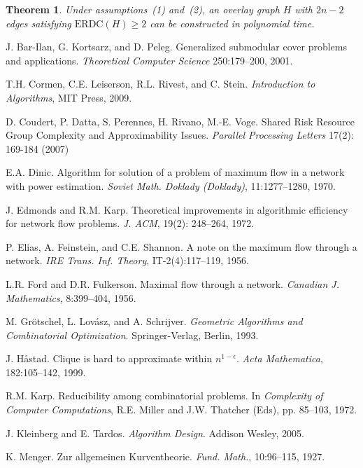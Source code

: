 \LongVersion \documentclass[11pt]{article}
\newtheorem{theorem}{Theorem}[section]
\theoremstyle{definition}
\theoremstyle{plain}
\newcommand{\ERDC}[0]{\mathrm{ERDC}}
\begin{document}
\begin{theorem} \label{theorem:ConstructionSparseERDC}
Under assumptions~(1) and~(2), an overlay graph $H$ with $2 n - 2$ edges
satisfying $\ERDC(H) \geq 2$ can be constructed in polynomial time.
\end{theorem}

\newpage
\begin{thebibliography}{99}

J. Bar-Ilan, G. Kortsarz, and D. Peleg.
Generalized submodular cover problems and applications.
\emph{Theoretical Computer Science} 250:179--200, 2001.

T.H. Cormen, C.E. Leiserson, R.L. Rivest, and C. Stein.
\emph{Introduction to Algorithms}, MIT Press, 2009.

D. Coudert, P. Datta, S. Perennes, H. Rivano, M.-E. Voge.
Shared Risk Resource Group Complexity and Approximability Issues.
{\em Parallel Processing Letters} 17(2): 169-184 (2007)

E.A. Dinic.
Algorithm for solution of a problem of maximum flow in a network with power
estimation.
\emph{Soviet Math. Doklady (Doklady)}, 11:1277--1280, 1970.

J. Edmonds and R.M. Karp.
Theoretical improvements in algorithmic efficiency for network flow problems.
\emph{J. ACM}, 19(2): 248--264, 1972.

P. Elias, A. Feinstein, and C.E. Shannon.
A note on the maximum flow through a network.
\emph{IRE Trans. Inf. Theory}, IT-2(4):117--119, 1956.

L.R. Ford and D.R. Fulkerson.
Maximal flow through a network.
\emph{Canadian J. Mathematics}, 8:399--404, 1956.

M. Gr\"{o}tschel, L. Lov\'{a}sz, and A. Schrijver.
\emph{Geometric Algorithms and Combinatorial Optimization}.
Springer-Verlag, Berlin, 1993.

J. H{\aa}stad.
Clique is hard to approximate within $n^{1 - \epsilon}$.
\emph{Acta Mathematica}, 182:105--142, 1999.

R.M. Karp.
Reducibility among combinatorial problems.
In \emph{Complexity of Computer Computations}, R.E. Miller and J.W. Thatcher
(Eds), pp. 85--103, 1972.

J. Kleinberg and E. Tardos.
\emph{Algorithm Design}.
Addison Wesley, 2005.

K. Menger.
Zur allgemeinen Kurventheorie.
\emph{Fund. Math.}, 10:96--115, 1927.


\end{thebibliography}
\end{document}
